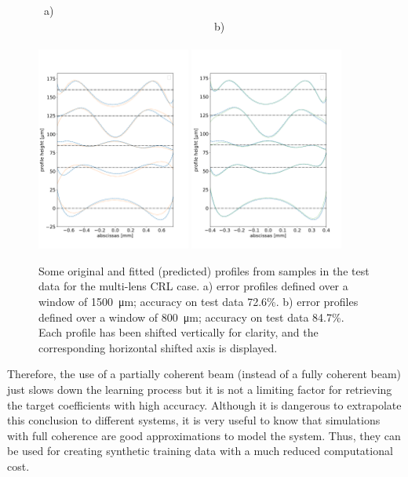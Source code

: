 \documentclass{iucr}
\newcommand{\inred}[1]{{\color{black}#1}}
\begin{document}
\onecolumn
\begin{figure}\label{fig:v26profiles}
~a)~~~~~~~~~~~~~~~~~~~~~~~~~~~~~~~~~~~~~~~~~~~~~~~~~~~~~~~~~~~~~~~~~~~~~~~~~~~~~~~~~~~~~~~~~b)~~~~~~~~~~~~~~~~~~~~~~~~~~~~~~~~~~~~~~~~~~~~~~~~~~~~~~~~~~~~~~~~~~~~\\
\includegraphics[width=0.45\textwidth]{figures/figure7a.pdf}
\includegraphics[width=0.45\textwidth]{figures/figure7b.pdf}
\caption{
Some original and fitted (predicted) profiles from samples in the test data for the multi-lens CRL case. a) error profiles defined over a window of \SI{1500}{\micro\meter};
accuracy on test data 72.6\%. 
b) error profiles defined over a window of \SI{800}{\micro\meter};
accuracy on test data 84.7\%.
\inred{Each profile has been shifted vertically for clarity, and the corresponding horizontal shifted axis is displayed.
    }
    }
\end{figure}
\twocolumn

Therefore, the use of a partially coherent beam (instead of a fully coherent beam) just slows down the learning process but it is not a limiting factor for retrieving the target coefficients with high accuracy. Although it is dangerous to extrapolate this conclusion to different systems, it is very useful to know that simulations with full coherence are good approximations to model the system. Thus, they can be used for creating synthetic training data with a much reduced computational cost.
\end{document}

